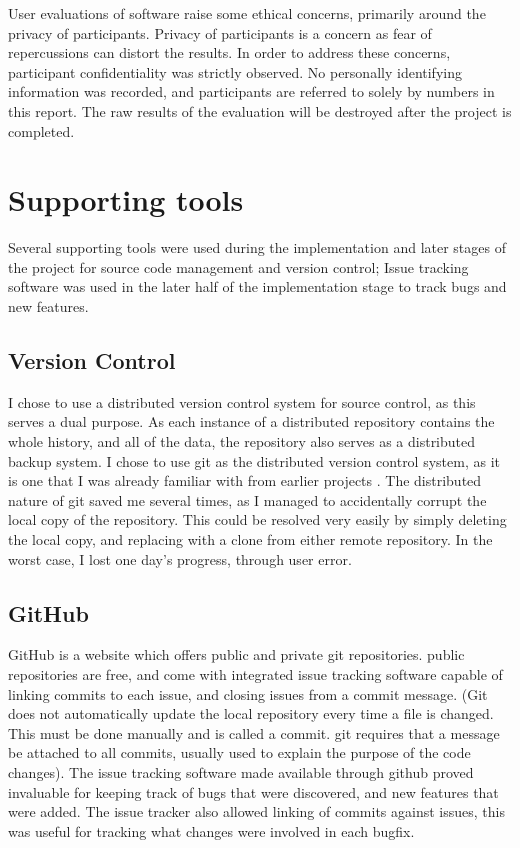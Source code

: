 User evaluations of software raise some ethical concerns, primarily around the privacy of participants. Privacy of participants is a concern as fear of repercussions can distort the results. In order to address these concerns, participant confidentiality was strictly observed. No personally identifying information was recorded, and participants are referred to solely by numbers in this report. The raw results of the evaluation will be destroyed after the project is completed.  

\section{Supporting tools}
Several supporting tools were used during the implementation and later stages of the project for source code management and version control; Issue tracking software was used in the later half of the implementation stage to track bugs and new features.

\subsection{Version Control}
I chose to use a distributed version control system for source control, as this serves a dual purpose. As each instance of a distributed repository contains the whole history, and all of the data, the repository also serves as a distributed backup system. 
I chose to use git as the distributed version control system, as it is one that I was already familiar with from earlier projects \cite{Swicegood:2008:PVC:1523278}. The distributed nature of git saved me several times, as I managed to accidentally corrupt the local copy of the repository. This could be resolved very easily by simply deleting the local copy, and replacing with a clone from either remote repository. In the worst case, I lost one day's progress, through user error.

\subsection{GitHub}
GitHub \cite{github2013} is a website which offers public and private git repositories. public repositories are free, and come with integrated issue tracking software capable of linking commits to each issue, and closing issues from a commit message. (Git does not automatically update the local repository every time a file is changed. This must be done manually and is called a commit. git requires that a message be attached to all commits, usually used to explain the purpose of the code changes). The issue tracking software made available through github proved invaluable for keeping track of bugs that were discovered, and new features that were added. The issue tracker also allowed linking of commits against issues, this was useful for tracking what changes were involved in each bugfix.


